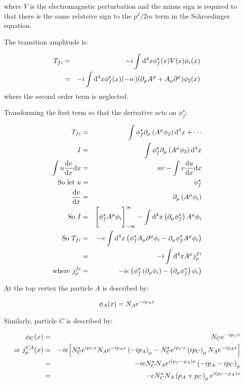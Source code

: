 where $V$ is the electromagnetic perturbation and the minus sign is required to that there is the same relateive sign to the $p^2/2m$ term in the Schroedinger equation.

The transition amplitude is:

\begin{eqnarray*}
  T_{fi} & = & -i\int\mathrm{d}^4x\phi^{\star}_f(x)V(x)\phi_i(x) \\
         & = & -i\int\mathrm{d}^4x\phi^{\star}_f(x)(-ie)(\partial_{\mu}A^{\mu} + A_{\mu}\partial^{\mu})\phi_2(x)
\end{eqnarray*}
where the second order term is neglected.

Transforming the first term so that the derivative acts on $\phi^{\star}_f$:

\begin{eqnarray*}
  T_{fi} & = & \int \phi^{\star}_f \partial_{\mu}\left(A^{\mu}\phi_2\right)\mathrm{d}^4x + \cdots \\
  I & = & \int \phi^{\star}_f\partial_{\mu}\left(A^{\mu}\phi_2\right)\mathrm{d}^4x \\
  \int u\frac{\mathrm{d}v}{\mathrm{d}x}\mathrm{d}x & = & uv - \int v \frac{\mathrm{d}u}{\mathrm{d}x}\mathrm{d}x \\
  \textrm{So let } u & = & \phi^{\star}_f \\
  \frac{\mathrm{d}v}{\mathrm{d}x} & = & \partial_{\mu}\left(A^{\mu}\phi_i\right) \\
  \textrm{So } I & = & \Bigg[ \phi^{\star}_fA^{\mu}\phi_i\Bigg]_{-\infty}^{\infty} - \int\mathrm{d}^4x\left(\partial_{\mu}\phi^{\star}_f\right)A^{\mu}\phi_i \\
  \textrm{So }T_{fi} & = & -e\int\mathrm{d}^4x\left(\phi^{\star}_fA_{\mu}\partial^{\mu}\phi_i - \partial_{\mu}\phi^{\star}_fA^{\mu}\phi_i\right) \\
  & = & -i\int\mathrm{d}^4xA^{\mu}j^{fi}_{\mu} \\
  \textrm{where } j^{fi}_{\mu} & = & -ie\left(\phi^{\star}_f\left(\partial_{\mu}\phi_i\right) - \left(\partial_{\mu}\phi^{\star}_f\right)\phi_i\right)
\end{eqnarray*}

At the top vertex the particle $A$ is described by:

\[
  \phi_A(x) = N_Ae^{-ip_Ax}
\]

Similarly, particle $C$ is described by:

\begin{eqnarray*}
  \phi_C(x) & = & N_Ce^{-ip_Cx} \\
  \Rightarrow j^{CA}_{\mu}(x) & = & -ie\Big[N^{\star}_Ce^{ip_Cx}N_Ae^{-ip_Ax}\left(-ip_A\right)_{\mu} - N^{\star}_C e^{ip_Cx}\left(ip_C\right)_{\mu}N_Ae^{-ip_Ax}\Big] \\
  & = & -ie N^{\star}_CN_Ae^{i\left(p_C-p_A\right)x}\left(-ip_A-ip_C\right)_{\mu} \\
  & = & -e N^{\star}_CN_A\left(p_A+p_C\right)_{\mu}e^{i\left(p_C-p_A\right)x}
\end{eqnarray*}

